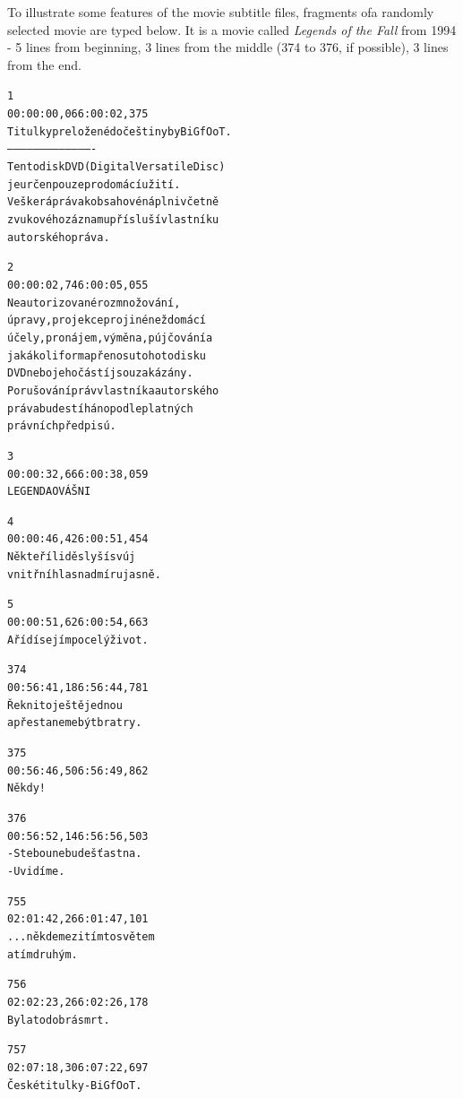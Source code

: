To illustrate some features of the movie subtitle files, fragments ofa randomly selected movie are typed below. It is a movie called \emph{Legends of the Fall} from 1994 - 5 lines from beginning, 3 lines from the middle (374 to 376, if possible), 3 lines from the end.
 

\newenvironment{subexam}{\begin{boxedminipage}[b]{0.4\textwidth}
\footnotesize
\begin{alltt}
}
{
\end{alltt}
\end{boxedminipage}}



\begin{subexam}
1
00:00:00,066 :00:02,375
Titulky preložené do češtiny by BiGfOoT.
----------------------------------------
Tento disk DVD (Digital Versatile Disc)
je určen pouze pro domácí užití.
Veškerá práva k obsahové náplni včetně
zvukového záznamu přísluší vlastníku
autorského práva.

2
00:00:02,746 :00:05,055
Neautorizované rozmnožování,
úpravy, projekce pro jiné než domácí
účely, pronájem, výměna, pújčování a
jakákoli forma přenosu tohoto disku
DVD nebo jeho částí jsou zakázány.
Porušování práv vlastníka autorského
práva bude stíháno podle platných
právních předpisú.

3
00:00:32,666 :00:38,059
LEGENDA O VÁŠNI

4
00:00:46,426 :00:51,454
Někteří lidě slyší svúj
vnitřní hlas nadmíru jasně.

5
00:00:51,626 :00:54,663
A řídí se jím po celý život.

374
00:56:41,186 :56:44,781
Řekni to ještě jednou
a přestaneme být bratry.

375
00:56:46,506 :56:49,862
Někdy!

376
00:56:52,146 :56:56,503
- S tebou nebude šťastna.
- Uvidíme.

755
02:01:42,266 :01:47,101
... někde mezi tímto světem
a tím druhým.

756
02:02:23,266 :02:26,178
Byla to dobrá smrt.

757
02:07:18,306 :07:22,697
České titulky - BiGfOoT.
\end{subexam}
\hspace{0.5cm}
